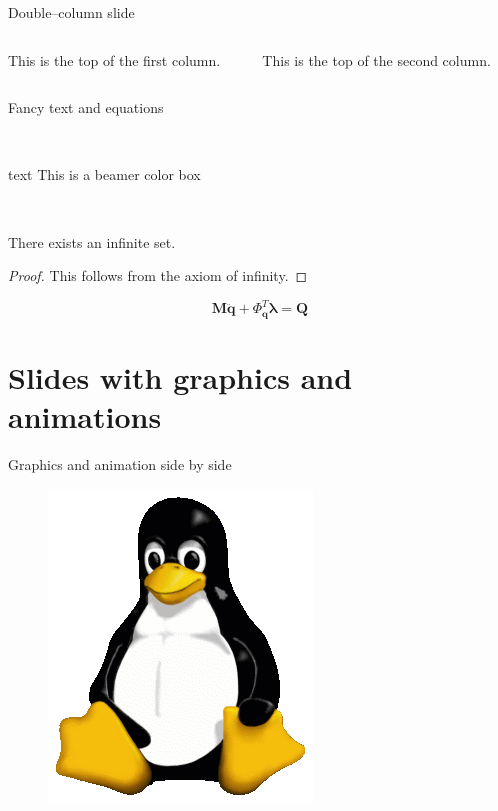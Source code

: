 \documentclass[11pt,t]{beamer}
\begin{document}
\begin{frame}[t]{Double--column slide}
	\begin{columns}[t]
		\begin{column}{.5\textwidth}
			This is the top of the first column.	
		\end{column}
		\begin{column}{.5\textwidth}
			This is the top of the second column.
		\end{column}
	\end{columns}	
\end{frame}
\begin{frame}{Fancy text and equations}
	\begin{center}~
		\begin{beamercolorbox}[wd=0.4\textwidth,rounded=true,center]{text}
			This is a beamer color box
		\end{beamercolorbox}~
	\end{center}
	\begin{theorem}
		There exists an infinite set.
	\end{theorem}
	\begin{proof}
		This follows from the axiom of infinity.
	\end{proof}
	\vspace{4mm}
	\begin{equation}
		\textbf{M} \ddot{\textbf{q}} + \boldsymbol{\mathsf{\Phi}}_{\textbf{q}}^T \boldsymbol\lambda = \textbf{Q}
	\end{equation}
\end{frame}
\section{Slides with graphics and animations}
\begin{frame}{Graphics and animation side by side}
	\begin{figure}
		\begin{minipage}[b]{0.49\linewidth}
			\centering
			\includegraphics[width=.3\textwidth]{Tux}
		\end{minipage}
		\hfill	
		\begin{minipage}[b]{0.5\linewidth}
			\centering
		\end{minipage}
	\end{figure}
\end{frame}
\end{document}
